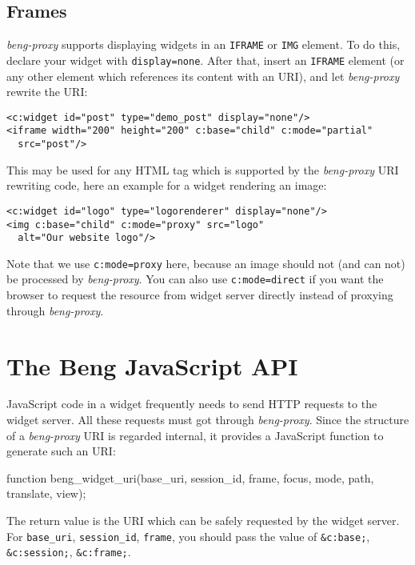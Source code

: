 \documentclass[a4paper,12pt]{article}
\begin{document}
\subsection{Frames}
\label{frames}

\emph{beng-proxy} supports displaying widgets in an \texttt{IFRAME} or
\texttt{IMG} element.  To do this, declare your widget with
\texttt{display=none}.  After that, insert an \texttt{IFRAME} element
(or any other element which references its content with an URI), and
let \emph{beng-proxy} rewrite the URI:

\begin{verbatim}
<c:widget id="post" type="demo_post" display="none"/>
<iframe width="200" height="200" c:base="child" c:mode="partial"
  src="post"/>
\end{verbatim}

This may be used for any HTML tag which is supported by the
\emph{beng-proxy} URI rewriting code, here an example for a widget
rendering an image:

\begin{verbatim}
<c:widget id="logo" type="logorenderer" display="none"/>
<img c:base="child" c:mode="proxy" src="logo"
  alt="Our website logo"/>
\end{verbatim}

Note that we use \texttt{c:mode=proxy} here, because an image should
not (and can not) be processed by \emph{beng-proxy}.  You can also use
\texttt{c:mode=direct} if you want the browser to request the resource
from widget server directly instead of proxying through
\emph{beng-proxy}.


\section{The Beng JavaScript API}

JavaScript code in a widget frequently needs to send HTTP requests to
the widget server.  All these requests must got through
\emph{beng-proxy}.  Since the structure of a \emph{beng-proxy} URI is
regarded internal, it provides a JavaScript function to generate such
an URI:

\begin{verbatim*}
function beng_widget_uri(base_uri, session_id, frame, focus, mode,
                         path, translate, view);
\end{verbatim*}

The return value is the URI which can be safely requested by the
widget server.  For \texttt{base\_uri}, \texttt{session\_id},
\texttt{frame}, you should pass the value of \texttt{\&c:base;},
\texttt{\&c:session;}, \texttt{\&c:frame;}.
\end{document}
